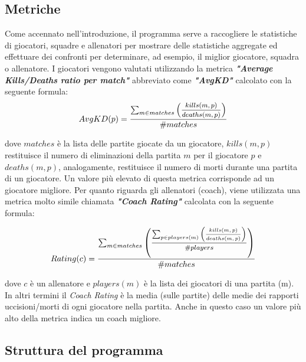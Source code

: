 \documentclass[a4paper, 11pt]{article}
\begin{document}
\subsection{Metriche}
Come accennato nell'introduzione, il programma serve a raccogliere le statistiche di giocatori, squadre e allenatori per mostrare delle statistiche aggregate ed effettuare dei confronti per determinare, ad esempio, il miglior giocatore, squadra o allenatore.
I giocatori vengono valutati utilizzando la metrica \textit{\textbf{"Average Kills/Deaths ratio per match"}} abbreviato come \textit{\textbf{"AvgKD"}} calcolato con la seguente formula:
\begin{displaymath}
AvgKD(p) = \frac{ \sum_{m\in matches} \left(\mfrac{kills(m,p)}{deaths(m,p)}\right)}{\#matches}
\end{displaymath}

dove $matches$ è la lista delle partite giocate da un giocatore, $kills(m,p)$ restituisce il numero di eliminazioni della partita $m$ per il giocatore $p$ e $deaths(m,p)$, analogamente, restituisce il numero di morti durante una partita di un giocatore.
Un valore più elevato di questa metrica corrisponde ad un giocatore migliore.
Per quanto riguarda gli allenatori (coach), viene utilizzata una metrica molto simile chiamata \textit{\textbf{"Coach Rating"}} calcolata con la seguente formula:

\begin{displaymath}
Rating(c) = \frac{ \sum_{m\in matches} \left(\mfrac{\sum_{p\in players(m)} \left(\mfrac{kills(m,p)}{deaths(m,p)}\right)}{\#players}\right)}{\#matches}
\end{displaymath}

dove $c$ è un allenatore e $players(m)$ è la lista dei giocatori di una partita (m).
In altri termini il \textit{Coach Rating} è la media (sulle partite) delle medie dei rapporti uccisioni/morti di ogni giocatore nella partita. Anche in questo caso un valore più alto della metrica indica un coach migliore.

\subsection{Struttura del programma}
\end{document}
